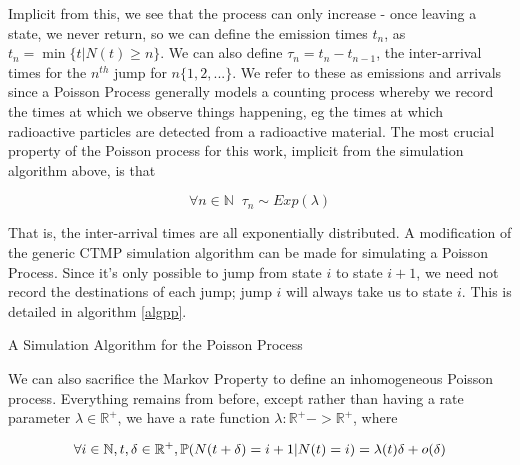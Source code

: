 Implicit from this, we see that the process can only increase - once leaving a state, we never return, so we can define the emission times $t_n$, as $t_n = \min\{t | N(t)\geqslant n\}$. We can also define $\tau_n = t_n-t_{n-1}$, the inter-arrival times for the $n^{th}$ jump for $n \{1,2,...\}$. We refer to these as emissions and arrivals since a Poisson Process generally models a counting process whereby we record the times at which we observe things happening, eg the times at which radioactive particles are detected from a radioactive material. The most crucial property of the Poisson process for this work, implicit from the simulation algorithm above, is that

$$
\forall n \in \mathbb{N} \; \; \tau_n \sim Exp(\lambda)
$$

That is, the inter-arrival times are all exponentially distributed. A modification of the generic CTMP simulation algorithm can be made for simulating  a Poisson Process. Since it's only possible to jump from state $i$ to state $i+1$, we need not record the destinations of each jump; jump $i$ will always take us to state $i$. This is detailed in algorithm \ref{algpp}.

\begin{algorithm}
\SetAlgoLined
{}

\caption{A Simulation Algorithm for the Poisson Process}\label{algpp}

\end{algorithm}

We can also sacrifice the Markov Property to define an inhomogeneous Poisson process. Everything remains from before, except rather than having a rate parameter $\lambda \in \mathbb{R}^{+}$, we have a rate function $\lambda : \mathbb{R}^{+} -> \mathbb{R}^{+}$, where

$$
\forall i \in \mathbb{N}, t,\delta \in \mathbb{R}^{+}, \mathbb{P} (N(t+\delta) = i+1 | N(t) = i) = \lambda(t) \delta + o(\delta)
$$

